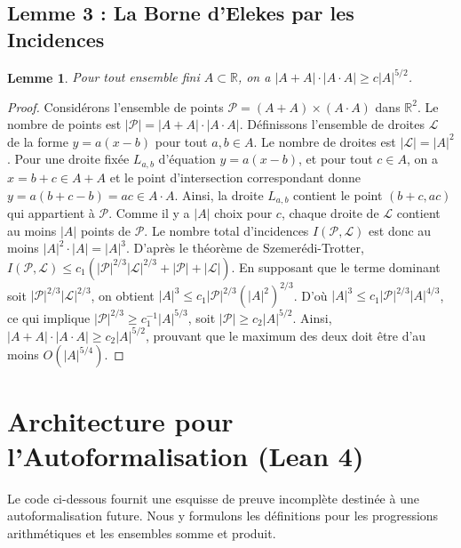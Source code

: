 \documentclass[11pt,a4paper]{article}
\newtheorem{lemma}[theorem]{Lemme}
\begin{document}
\subsection{Lemme 3 : La Borne d'Elekes par les Incidences}
\begin{lemma}
Pour tout ensemble fini $A \subset \mathbb{R}$, on a $|A+A| \cdot |A \cdot A| \ge c |A|^{5/2}$.
\end{lemma}
\begin{proof}
Considérons l'ensemble de points $\mathcal{P} = (A+A) \times (A \cdot A)$ dans $\mathbb{R}^2$. Le nombre de points est $|\mathcal{P}| = |A+A| \cdot |A \cdot A|$.
Définissons l'ensemble de droites $\mathcal{L}$ de la forme $y = a(x - b)$ pour tout $a, b \in A$. Le nombre de droites est $|\mathcal{L}| = |A|^2$.
Pour une droite fixée $L_{a,b}$ d'équation $y = a(x - b)$, et pour tout $c \in A$, on a $x = b + c \in A+A$ et le point d'intersection correspondant donne $y = a(b+c-b) = ac \in A \cdot A$. Ainsi, la droite $L_{a,b}$ contient le point $(b+c, ac)$ qui appartient à $\mathcal{P}$.
Comme il y a $|A|$ choix pour $c$, chaque droite de $\mathcal{L}$ contient au moins $|A|$ points de $\mathcal{P}$.
Le nombre total d'incidences $I(\mathcal{P}, \mathcal{L})$ est donc au moins $|A|^2 \cdot |A| = |A|^3$.
D'après le théorème de Szemerédi-Trotter, $I(\mathcal{P}, \mathcal{L}) \le c_1 \left( |\mathcal{P}|^{2/3} |\mathcal{L}|^{2/3} + |\mathcal{P}| + |\mathcal{L}| \right)$.
En supposant que le terme dominant soit $|\mathcal{P}|^{2/3} |\mathcal{L}|^{2/3}$, on obtient $|A|^3 \le c_1 |\mathcal{P}|^{2/3} (|A|^2)^{2/3}$.
D'où $|A|^3 \le c_1 |\mathcal{P}|^{2/3} |A|^{4/3}$, ce qui implique $|\mathcal{P}|^{2/3} \ge c_1^{-1} |A|^{5/3}$, soit $|\mathcal{P}| \ge c_2 |A|^{5/2}$.
Ainsi, $|A+A| \cdot |A \cdot A| \ge c_2 |A|^{5/2}$, prouvant que le maximum des deux doit être d'au moins $O(|A|^{5/4})$.
\end{proof}

\section{Architecture pour l'Autoformalisation (Lean 4)}
Le code ci-dessous fournit une esquisse de preuve incomplète destinée à une autoformalisation future. Nous y formulons les définitions pour les progressions arithmétiques et les ensembles somme et produit.
\end{document}
